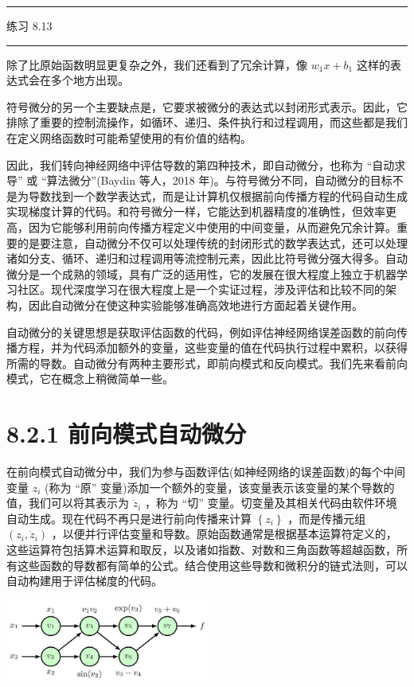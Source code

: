 \documentclass[10pt]{report}
\newcommand{\HRule}{\begin{center}\rule{0.9\linewidth}{0.2mm}\end{center}}
\begin{document}
\HRule

练习 8.13

\HRule

除了比原始函数明显更复杂之外，我们还看到了冗余计算，像 \({w}_{1}x + {b}_{1}\) 这样的表达式会在多个地方出现。

符号微分的另一个主要缺点是，它要求被微分的表达式以封闭形式表示。因此，它排除了重要的控制流操作，如循环、递归、条件执行和过程调用，而这些都是我们在定义网络函数时可能希望使用的有价值的结构。

因此，我们转向神经网络中评估导数的第四种技术，即自动微分，也称为 “自动求导” 或 “算法微分”(Baydin 等人，2018 年)。与符号微分不同，自动微分的目标不是为导数找到一个数学表达式，而是让计算机仅根据前向传播方程的代码自动生成实现梯度计算的代码。和符号微分一样，它能达到机器精度的准确性，但效率更高，因为它能够利用前向传播方程定义中使用的中间变量，从而避免冗余计算。重要的是要注意，自动微分不仅可以处理传统的封闭形式的数学表达式，还可以处理诸如分支、循环、递归和过程调用等流控制元素，因此比符号微分强大得多。自动微分是一个成熟的领域，具有广泛的适用性，它的发展在很大程度上独立于机器学习社区。现代深度学习在很大程度上是一个实证过程，涉及评估和比较不同的架构，因此自动微分在使这种实验能够准确高效地进行方面起着关键作用。

自动微分的关键思想是获取评估函数的代码，例如评估神经网络误差函数的前向传播方程，并为代码添加额外的变量，这些变量的值在代码执行过程中累积，以获得所需的导数。自动微分有两种主要形式，即前向模式和反向模式。我们先来看前向模式，它在概念上稍微简单一些。

\section*{8.2.1 前向模式自动微分}

在前向模式自动微分中，我们为参与函数评估(如神经网络的误差函数)的每个中间变量 \({z}_{i}\) (称为 “原” 变量)添加一个额外的变量，该变量表示该变量的某个导数的值，我们可以将其表示为 \({\dot{z}}_{i}\) ，称为 “切” 变量。切变量及其相关代码由软件环境自动生成。现在代码不再只是进行前向传播来计算 \(\left\{  {z}_{i}\right\}\) ，而是传播元组 \(\left( {{z}_{i},{\dot{z}}_{i}}\right)\) ，以便并行评估变量和导数。原始函数通常是根据基本运算符定义的，这些运算符包括算术运算和取反，以及诸如指数、对数和三角函数等超越函数，所有这些函数的导数都有简单的公式。结合使用这些导数和微积分的链式法则，可以自动构建用于评估梯度的代码。

\begin{center}
\includegraphics[max width=0.5\textwidth]{images/0194e279-9b28-703a-88f4-c3ac21e2010d_266_871_354_671_269_0.jpg}
\end{center}
\hspace*{3em} 
\end{document}
